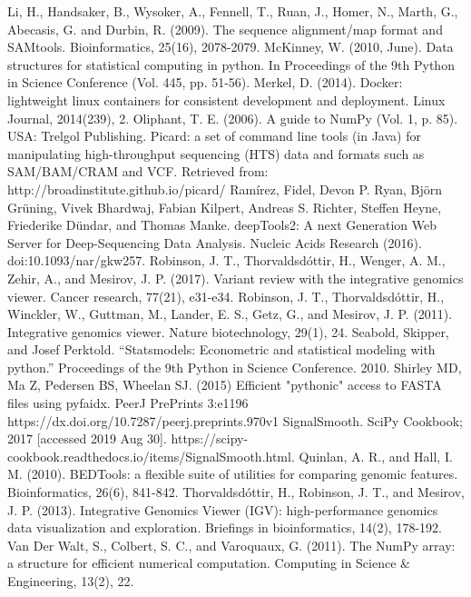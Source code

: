 \documentclass{article}
\begin{document}
\begin{sloppypar}
\begin{thebibliography}{9}
Li, H., Handsaker, B., Wysoker, A., Fennell, T., Ruan, J., Homer, N., Marth, G., Abecasis, G. and Durbin, R. (2009). The sequence alignment/map format and SAMtools. Bioinformatics, 25(16), 2078-2079.
McKinney, W. (2010, June). Data structures for statistical computing in python. In Proceedings of the 9th Python in Science Conference (Vol. 445, pp. 51-56).
Merkel, D. (2014). Docker: lightweight linux containers for consistent development and deployment. Linux Journal, 2014(239), 2.
Oliphant, T. E. (2006). A guide to NumPy (Vol. 1, p. 85). USA: Trelgol Publishing.
Picard: a set of command line tools (in Java) for manipulating high-throughput sequencing (HTS) data and formats such as SAM/BAM/CRAM and VCF. Retrieved from: http://broadinstitute.github.io/picard/
Ramírez, Fidel, Devon P. Ryan, Björn Grüning, Vivek Bhardwaj, Fabian Kilpert, Andreas S. Richter, Steffen Heyne, Friederike Dündar, and Thomas Manke. deepTools2: A next Generation Web Server for Deep-Sequencing Data Analysis. Nucleic Acids Research (2016). doi:10.1093/nar/gkw257.
Robinson, J. T., Thorvaldsdóttir, H., Wenger, A. M., Zehir, A., and Mesirov, J. P. (2017). Variant review with the integrative genomics viewer. Cancer research, 77(21), e31-e34.
Robinson, J. T., Thorvaldsdóttir, H., Winckler, W., Guttman, M., Lander, E. S., Getz, G., and Mesirov, J. P. (2011). Integrative genomics viewer. Nature biotechnology, 29(1), 24.
Seabold, Skipper, and Josef Perktold. “Statsmodels: Econometric and statistical modeling with python.” Proceedings of the 9th Python in Science Conference. 2010.
Shirley MD, Ma Z, Pedersen BS, Wheelan SJ. (2015) Efficient
"pythonic" access to FASTA files using pyfaidx. PeerJ PrePrints 3:e1196
https://dx.doi.org/10.7287/peerj.preprints.970v1
SignalSmooth. SciPy Cookbook; 2017 [accessed 2019 Aug 30].
https://scipy-cookbook.readthedocs.io/items/SignalSmooth.html.
Quinlan, A. R., and Hall, I. M. (2010). BEDTools: a flexible suite of utilities for comparing genomic features. Bioinformatics, 26(6), 841-842.
Thorvaldsdóttir, H., Robinson, J. T., and Mesirov, J. P. (2013). Integrative Genomics Viewer (IGV): high-performance genomics data visualization and exploration. Briefings in bioinformatics, 14(2), 178-192.
Van Der Walt, S., Colbert, S. C., and Varoquaux, G. (2011). The NumPy array: a structure for efficient numerical computation. Computing in Science \& Engineering, 13(2), 22.

\end{thebibliography}
\end{sloppypar}
\end{document}
